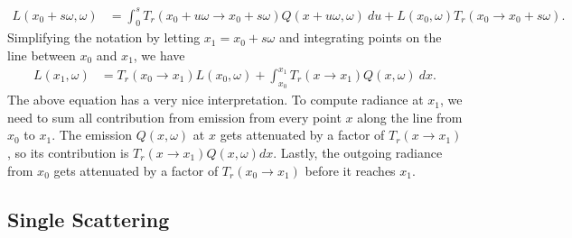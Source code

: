 \documentclass[10pt]{article}
\begin{document}
\begin{itemize}
\begin{align*}
				L(x_0 + s\omega, \omega) &= \int_0^s T_r(x_0 + u\omega \rightarrow x_0 + s\omega) Q(x+u\omega, \omega)\ du + L(x_0, \omega) T_r(x_0 \rightarrow x_0 + s\omega).
			\end{align*}
			Simplifying the notation by letting $x_1 = x_0 + s\omega$ and integrating points on the line between $x_0$ and $x_1$, we have
			\begin{align*}
				L(x_1, \omega) &= T_r(x_0 \rightarrow x_1) L(x_0, \omega) + \int_{x_0}^{x_1} T_r(x \rightarrow x_1) Q(x, \omega)\ dx.
			\end{align*}
			The above equation has a very nice interpretation. To compute radiance at $x_1$, we need to sum all contribution from emission
			from every point $x$ along the line from $x_0$ to $x_1$. The emission $Q(x,\omega)$ at $x$ gets attenuated by a factor
			of $T_r(x \rightarrow x_1)$, so its contribution is $T_r(x \rightarrow x_1) Q(x,\omega) dx$. Lastly, the outgoing
			radiance from $x_0$ gets attenuated by a factor of $T_r(x_0 \rightarrow x_1)$ before it reaches $x_1$.
 		\end{itemize}
	
	\subsection{Single Scattering} %
	\label{sub:single_scattering}
	
\end{document}
